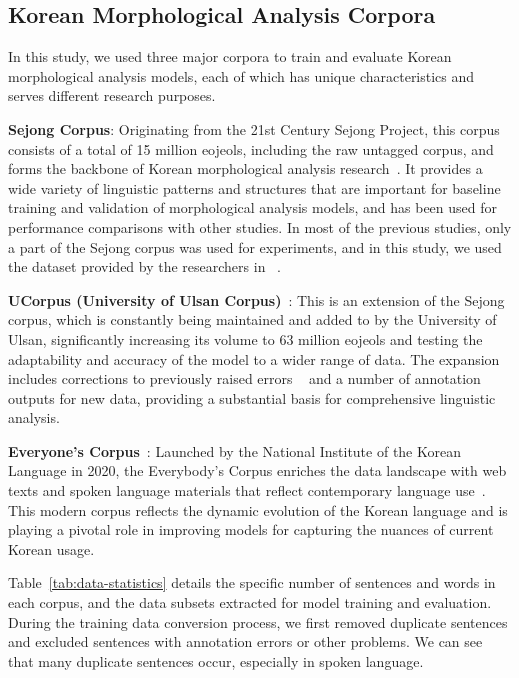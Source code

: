 \documentclass[AMS,STIX2COL]{WileyNJD-v2}
\begin{document}
    \subsection{Korean Morphological Analysis Corpora}\label{subsec:korean-morphological-analysis-corpora}

    In this study, we used three major corpora to train and evaluate Korean morphological analysis models, each of which has unique characteristics and serves different research purposes.

    \textbf{Sejong Corpus}: Originating from the 21st Century Sejong Project, this corpus consists of a total of 15 million eojeols, including the raw untagged corpus, and forms the backbone of Korean morphological analysis research~\cite{ChoeMW2008}.
    It provides a wide variety of linguistic patterns and structures that are important for baseline training and validation of morphological analysis models, and has been used for performance comparisons with other studies.
    In most of the previous studies, only a part of the Sejong corpus was used for experiments, and in this study, we used the dataset provided by the researchers in ~\cite{NaSH2014}.

    \textbf{UCorpus (University of Ulsan Corpus)}~\cite{UCorpusHG}: This is an extension of the Sejong corpus, which is constantly being maintained and added to by the University of Ulsan, significantly increasing its volume to 63 million eojeols and testing the adaptability and accuracy of the model to a wider range of data.
    The expansion includes corrections to previously raised errors ~\cite{KimIH2010} and a number of annotation outputs for new data, providing a substantial basis for comprehensive linguistic analysis.

    \textbf{Everyone's Corpus}~\cite{EveryoneCorpus}: Launched by the National Institute of the Korean Language in 2020, the Everybody's Corpus enriches the data landscape with web texts and spoken language materials that reflect contemporary language use~\cite{KimIH2019}.
    This modern corpus reflects the dynamic evolution of the Korean language and is playing a pivotal role in improving models for capturing the nuances of current Korean usage.

    Table~\ref{tab:data-statistics} details the specific number of sentences and words in each corpus, and the data subsets extracted for model training and evaluation.
    During the training data conversion process, we first removed duplicate sentences and excluded sentences with annotation errors or other problems.
    We can see that many duplicate sentences occur, especially in spoken language.
\end{document}
